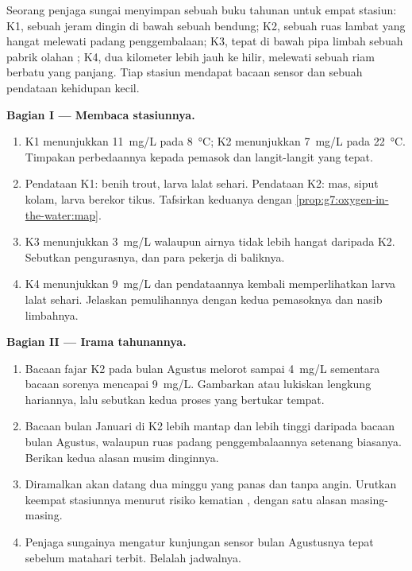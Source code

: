 \begin{problem}\label{pb:g7:oxygen-in-the-water:1}
Seorang penjaga sungai menyimpan sebuah buku tahunan untuk empat
stasiun: K1, sebuah jeram dingin di bawah sebuah bendung; K2, sebuah
ruas lambat yang hangat melewati padang penggembalaan; K3, tepat di
bawah pipa limbah sebuah pabrik olahan ; K4, dua kilometer lebih
jauh ke hilir, melewati sebuah riam berbatu yang panjang. Tiap stasiun
mendapat bacaan sensor dan sebuah pendataan kehidupan kecil.

\medskip\noindent\textbf{Bagian I --- Membaca stasiunnya.}
\begin{enumerate}
  \item K1 menunjukkan \qty{11}{mg/L} pada
        \qty{8}{\degreeCelsius}; K2 menunjukkan \qty{7}{mg/L}
        pada \qty{22}{\degreeCelsius}. Timpakan perbedaannya kepada
        pemasok dan langit-langit yang tepat.
  \item Pendataan K1: benih  trout, larva lalat sehari. Pendataan
        K2:  mas, siput kolam, larva berekor tikus. Tafsirkan
        keduanya dengan \cref{prop:g7:oxygen-in-the-water:map}.
  \item K3 menunjukkan \qty{3}{mg/L} walaupun airnya tidak lebih
        hangat daripada K2. Sebutkan pengurasnya, dan para pekerja di
        baliknya.
  \item K4 menunjukkan \qty{9}{mg/L} dan pendataannya kembali
        memperlihatkan larva lalat sehari. Jelaskan pemulihannya
        dengan kedua pemasoknya dan nasib limbahnya.
\end{enumerate}

\medskip\noindent\textbf{Bagian II --- Irama tahunannya.}
\begin{enumerate}[resume]
  \item Bacaan fajar K2 pada bulan Agustus melorot sampai
        \qty{4}{mg/L} sementara bacaan sorenya mencapai
        \qty{9}{mg/L}. Gambarkan atau lukiskan lengkung hariannya,
        lalu sebutkan kedua proses yang bertukar tempat.
  \item Bacaan bulan Januari di K2 lebih mantap dan lebih tinggi
        daripada bacaan bulan Agustus, walaupun ruas padang
        penggembalaannya setenang biasanya. Berikan kedua alasan musim
        dinginnya.
  \item Diramalkan akan datang dua minggu yang panas dan tanpa angin.
        Urutkan keempat stasiunnya menurut risiko kematian ,
        dengan satu alasan masing-masing.
  \item Penjaga sungainya mengatur kunjungan sensor bulan Agustusnya
        tepat sebelum matahari terbit. Belalah jadwalnya.
\end{enumerate}


\end{problem}
